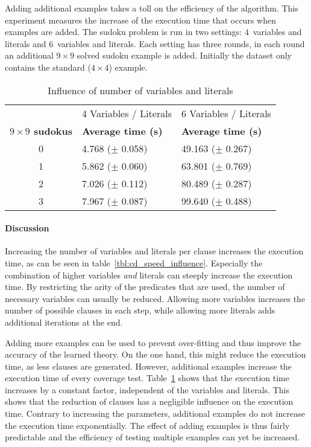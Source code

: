 \begin{experiment}
	Adding additional examples takes a toll on the efficiency of the algorithm.
	This experiment measures the increase of the execution time that occurs when examples are added.
	The sudoku problem is run in two settings: $4$~variables and literals and $6$~variables and literals.
	Each setting has three rounds, in each round an additional $9 \times 9$ solved sudoku example is added.
	Initially the dataset only contains the standard ($4 \times 4$) example.

	\begin{table}[!htp]
		\begin{tabularx}{\textwidth}{c|XX}
			& 4 Variables / Literals & 6 Variables / Literals \\
			\textbf{$9 \times 9$ sudokus}	& \textbf{Average time (s)} & \textbf{Average time (s)} \\
			\toprule
			0 & 4.768 ($\pm$ 0.058)	& 49.163	($\pm$ 0.267)	\\
			1 & 5.862 ($\pm$ 0.060)	& 63.801	($\pm$ 0.769)	\\
			2 & 7.026 ($\pm$ 0.112)	& 80.489	($\pm$ 0.287)	\\
			3 & 7.967 ($\pm$ 0.087)	& 99.640	($\pm$ 0.488)	\\
		\end{tabularx}
		\caption{Influence of number of variables and literals}
		\label{tbl:cd_speed_examples}
	\end{table}
\end{experiment}

\paragraph{Discussion}
Increasing the number of variables and literals per clause increases the execution time, as can be seen in table~\ref{tbl:cd_speed_influence}.
Especially the combination of higher variables \emph{and} literals can steeply increase the execution time.
By restricting the arity of the predicates that are used, the number of necessary variables can usually be reduced.
Allowing more variables increases the number of possible clauses in each step, while allowing more literals adds additional iterations at the end.

Adding more examples can be used to prevent over-fitting and thus improve the accuracy of the learned theory.
On the one hand, this might reduce the execution time, as less clauses are generated.
However, additional examples increase the execution time of every coverage test.
Table~\ref{tbl:cd_speed_examples} shows that the execution time increases by a constant factor, independent of the variables and literals.
This shows that the reduction of clauses has a negligible influence on the execution time.
Contrary to increasing the parameters, additional examples do not increase the execution time exponentially.
The effect of adding examples is thus fairly predictable and the efficiency of testing multiple examples can yet be increased.

